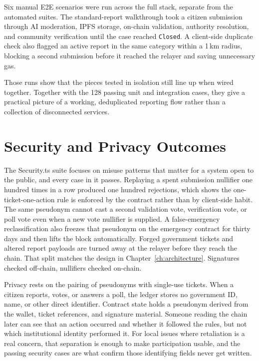 Six manual \ac{E2E} scenarios were run across the full stack, separate from the automated suites. The standard-report walkthrough took a citizen submission through AI moderation, \ac{IPFS} storage, on-chain validation, authority resolution, and community verification until the case reached \texttt{Closed}. A client-side duplicate check also flagged an active report in the same category within a 1\,km radius, blocking a second submission before it reached the relayer and saving unnecessary gas.

Those runs show that the pieces tested in isolation still line up when wired together. Together with the 128 passing unit and integration cases, they give a practical picture of a working, deduplicated reporting flow rather than a collection of disconnected services.

\section{Security and Privacy Outcomes}
\label{sec:security-privacy-findings}

The Security.ts suite focuses on misuse patterns that matter for a system open to the public, and every case in it passes. Replaying a spent submission nullifier one hundred times in a row produced one hundred rejections, which shows the one-ticket-one-action rule is enforced by the contract rather than by client-side habit. The same pseudonym cannot cast a second validation vote, verification vote, or poll vote even when a new vote nullifier is supplied. A false-emergency reclassification also freezes that pseudonym on the emergency contract for thirty days and then lifts the block automatically. Forged government tickets and altered report payloads are turned away at the relayer before they reach the chain. That split matches the design in Chapter~\ref{ch:architecture}. Signatures checked off-chain, nullifiers checked on-chain.

Privacy rests on the pairing of pseudonyms with single-use tickets. When a citizen reports, votes, or answers a poll, the ledger stores no government ID, name, or other direct identifier. Contract state holds a pseudonym derived from the wallet, ticket references, and signature material. Someone reading the chain later can see that an action occurred and whether it followed the rules, but not which institutional identity performed it. For local issues where retaliation is a real concern, that separation is enough to make participation usable, and the passing security cases are what confirm those identifying fields never get written.

